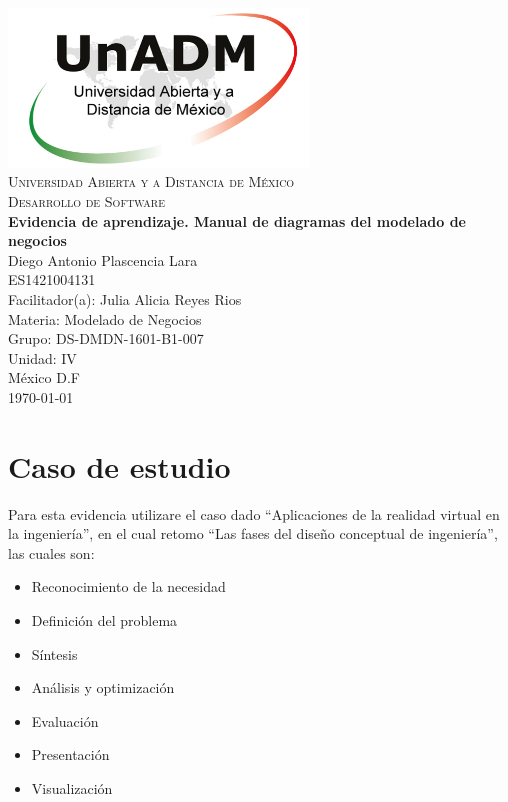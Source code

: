 \documentclass[spanish,12pt,letterpapper]{article}
\begin{document}
	\begin{titlepage}
		\begin{center}
			\includegraphics[width=0.6\textwidth]{../logoUnADM}~\\[1cm] 
			\textsc{Universidad Abierta y a Distancia de México}\\[0.8cm]
			\textsc{Desarrollo de Software}\\[1.8cm]
			
			\textbf{ \Large Evidencia de aprendizaje. Manual de diagramas del modelado de negocios }\\[3cm]
			
			Diego Antonio Plascencia Lara\\ ES1421004131 \\[0.4cm]
			Facilitador(a): Julia Alicia Reyes Rios\\
			Materia: Modelado de Negocios\\
			Grupo: DS-DMDN-1601-B1-007 \\
			Unidad: IV \\
			
			\vfill México D.F\\{\today}
			
		\end{center}
	\end{titlepage}
	
	\printindex
	
	
	\section{Caso de estudio}
	Para esta evidencia utilizare el caso dado ``Aplicaciones de la realidad virtual en la ingeniería'', en el cual retomo ``Las fases del diseño conceptual de ingeniería'', las cuales son:
	\begin{itemize}
	\item Reconocimiento de la necesidad
	\item Definición del problema
	\item Síntesis
	\item Análisis y optimización
	\item Evaluación
	\item Presentación
	\item Visualización
	\end{itemize}
	
\end{document}

